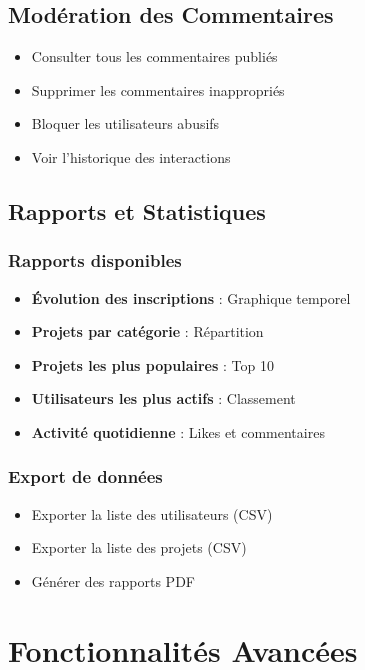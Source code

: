 \documentclass[12pt,a4paper]{article}
\begin{document}
\subsection{Modération des Commentaires}

\begin{itemize}[leftmargin=*]
    \item Consulter tous les commentaires publiés
    \item Supprimer les commentaires inappropriés
    \item Bloquer les utilisateurs abusifs
    \item Voir l'historique des interactions
\end{itemize}

\subsection{Rapports et Statistiques}

\subsubsection{Rapports disponibles}
\begin{itemize}[leftmargin=*]
    \item \textbf{Évolution des inscriptions} : Graphique temporel
    \item \textbf{Projets par catégorie} : Répartition
    \item \textbf{Projets les plus populaires} : Top 10
    \item \textbf{Utilisateurs les plus actifs} : Classement
    \item \textbf{Activité quotidienne} : Likes et commentaires
\end{itemize}

\subsubsection{Export de données}
\begin{itemize}[leftmargin=*]
    \item Exporter la liste des utilisateurs (CSV)
    \item Exporter la liste des projets (CSV)
    \item Générer des rapports PDF
\end{itemize}

\newpage
\section{Fonctionnalités Avancées}
\end{document}

